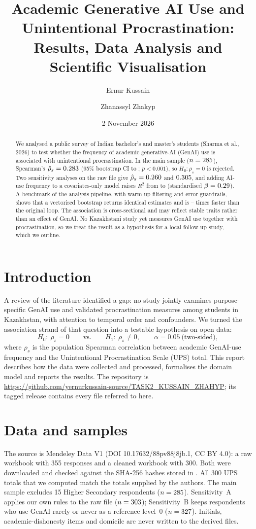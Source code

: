\documentclass[11pt,a4paper]{article}
\title{Academic Generative AI Use and Unintentional Procrastination:\\ Results, Data Analysis and Scientific Visualisation}
\author{Ernur Kussain \and Zhanassyl Zhakyp}
\date{2 November 2026}
\newcommand{\repo}{\url{https://github.com/yernurkussain-source/TASK2_KUSSAIN_ZHAHYP}}
\begin{document}
\maketitle

\begin{abstract}
We analysed a public survey of Indian bachelor's and master's students (Sharma et al., 2026) to test whether the frequency of academic generative-AI (GenAI) use is associated with unintentional procrastination. In the main sample ($n=285$), Spearman's $\hat\rho_s=0.283$ (95\% bootstrap CI \vrhoMainLo{} to \vrhoMainHi; $p<0.001$), so $H_0:\rho_s=0$ is rejected. Two sensitivity analyses on the raw file give $\hat\rho_s=0.260$ and $0.305$, and adding AI-use frequency to a covariates-only model raises $R^2$ from \vrTwoBase{} to \vrTwoProp{} (standardised $\beta=0.29$). A benchmark of the analysis pipeline, with warm-up filtering and error guardrails, shows that a vectorised bootstrap returns identical estimates and is \vspeedMin--\vspeedMax{} times faster than the original loop. The association is cross-sectional and may reflect stable traits rather than an effect of GenAI. No Kazakhstani study yet measures GenAI use together with procrastination, so we treat the result as a hypothesis for a local follow-up study, which we outline.
\end{abstract}

\section{Introduction}
A review of the literature identified a gap: no study jointly examines purpose-specific GenAI use and validated procrastination measures among students in Kazakhstan, with attention to temporal order and confounders. We turned the association strand of that question into a testable hypothesis on open data:
\begin{equation}
H_0:\ \rho_s = 0 \qquad\text{vs.}\qquad H_1:\ \rho_s\neq0,\qquad \alpha=0.05\ \text{(two-sided)},
\label{eq:h0}
\end{equation}
where $\rho_s$ is the population Spearman correlation between academic GenAI-use frequency and the Unintentional Procrastination Scale (UPS) total. This report describes how the data were collected and processed, formalises the domain model and reports the results. The repository is \repo; its tagged release contains every file referred to here.

\section{Data and samples}
The source is Mendeley Data V1 (DOI 10.17632/88pv88j8jb.1, CC BY 4.0): a raw workbook with 355 responses and a cleaned workbook with 300. Both were downloaded and checked against the SHA-256 hashes stored in . All 300 UPS totals that we computed match the totals supplied by the authors. The main sample excludes 15 Higher Secondary respondents ($n=285$). Sensitivity~A applies our own rules to the raw file ($n=303$); Sensitivity~B keeps respondents who use GenAI rarely or never as a reference level~0 ($n=327$). Initials, academic-dishonesty items and domicile are never written to the derived files.
\end{document}
